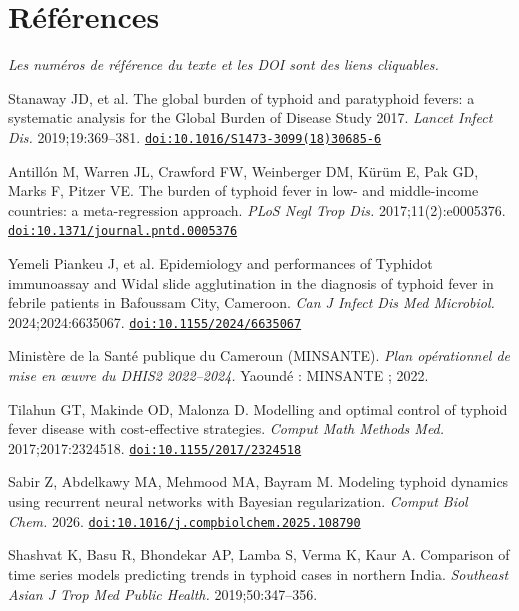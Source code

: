 \documentclass[11pt]{article}
\begin{document}
\section*{Références}
\footnotesize
\noindent\textit{Les numéros de référence du texte et les DOI sont des liens cliquables.}
\begin{enumerate}[label={[\arabic*]},leftmargin=2.2em,itemsep=0.5pt]
\item\hypertarget{ref1}{}Stanaway JD, et al. The global burden of typhoid and paratyphoid fevers: a systematic analysis for the Global Burden of Disease Study 2017. \textit{Lancet Infect Dis.} 2019;19:369--381. \href{https://doi.org/10.1016/S1473-3099(18)30685-6}{\nolinkurl{doi:10.1016/S1473-3099(18)30685-6}}
\item\hypertarget{ref2}{}Antillón M, Warren JL, Crawford FW, Weinberger DM, Kürüm E, Pak GD, Marks F, Pitzer VE. The burden of typhoid fever in low- and middle-income countries: a meta-regression approach. \textit{PLoS Negl Trop Dis.} 2017;11(2):e0005376. \href{https://doi.org/10.1371/journal.pntd.0005376}{\nolinkurl{doi:10.1371/journal.pntd.0005376}}
\item\hypertarget{ref3}{}Yemeli Piankeu J, et al. Epidemiology and performances of Typhidot immunoassay and Widal slide agglutination in the diagnosis of typhoid fever in febrile patients in Bafoussam City, Cameroon. \textit{Can J Infect Dis Med Microbiol.} 2024;2024:6635067. \href{https://doi.org/10.1155/2024/6635067}{\nolinkurl{doi:10.1155/2024/6635067}}
\item\hypertarget{ref4}{}Ministère de la Santé publique du Cameroun (MINSANTE). \textit{Plan opérationnel de mise en œuvre du DHIS2 2022--2024.} Yaoundé : MINSANTE ; 2022.
\item\hypertarget{ref5}{}Tilahun GT, Makinde OD, Malonza D. Modelling and optimal control of typhoid fever disease with cost-effective strategies. \textit{Comput Math Methods Med.} 2017;2017:2324518. \href{https://doi.org/10.1155/2017/2324518}{\nolinkurl{doi:10.1155/2017/2324518}}
\item\hypertarget{ref6}{}Sabir Z, Abdelkawy MA, Mehmood MA, Bayram M. Modeling typhoid dynamics using recurrent neural networks with Bayesian regularization. \textit{Comput Biol Chem.} 2026. \href{https://doi.org/10.1016/j.compbiolchem.2025.108790}{\nolinkurl{doi:10.1016/j.compbiolchem.2025.108790}}
\item\hypertarget{ref7}{}Shashvat K, Basu R, Bhondekar AP, Lamba S, Verma K, Kaur A. Comparison of time series models predicting trends in typhoid cases in northern India. \textit{Southeast Asian J Trop Med Public Health.} 2019;50:347--356.

\end{enumerate}
\end{document}
